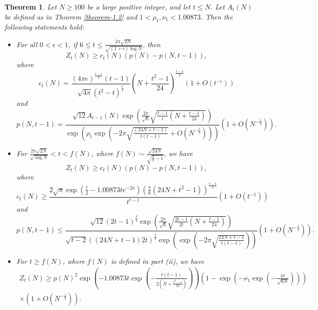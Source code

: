 \documentclass[11pt]{amsart}
\theoremstyle{plain}
\newtheorem{theorem}{Theorem}[section]
\numberwithin{equation}{section}
\begin{document}
	\begin{theorem}\label{theorem-1.4}
		Let $N\ge 100$ be a large positive integer, and let $t \le N$. Let $A_{t}(N)$ be defined as in Theorem \ref{theorem-1.2} and $1<\rho_1, \nu_1<1.00873$. Then the following statements hold:
		\begin{itemize}
			\item[\hypertarget{thm1.4i}{($i$)}]For all $0<\epsilon<1$, if $6\leq t \leq \frac{2\pi\sqrt{2N}}{\sqrt{(1+\epsilon)\log N}}$, then
			\begin{equation*}
				Z_{t}(N)\ge c_{t}(N)(p(N)-p(N,t-1)), 
			\end{equation*}
			where 
			\begin{equation*}
				c_{t}(N)=\frac{(4\pi e)^{\frac{t-1}{2}}(t-1)}{\sqrt{4\pi}(t^{2}-t)^{\frac{t}{2}}} \left(N+\frac{t^{2}-1}
				{24}\right)^{\frac{t-3}{2}}(1+O(t^{-\epsilon}))   
			\end{equation*}
			and
			\begin{equation*}
				p(N,t-1)=\frac{\sqrt{12}A_{t-1}(N)\exp\left(\frac{2\pi}{\sqrt{6}}\sqrt{\frac{t-1}{t}\left(N+\frac{t-1}{24}\right)}\right)}{\exp\left(\rho_{1}\exp\left(-2\pi\sqrt{\frac{\left(24N+t-1\right)}{t(t-1)}}+O\left(N^{-\frac{1}{2}}\right)\right)\right)}\left(1+O\left(N^{-\frac{1}{2}}\right)\right).   
			\end{equation*} 
			\item[\hypertarget{thm1.4ii}{($ii$)}] For  
			$\frac{2\pi\sqrt{2N}}{\sqrt{\log N}}< t < f(N)$, where $f(N)\sim \frac{\sqrt{24N}}{\sqrt{\frac{6}{\pi}-1}}$, we have
			\begin{equation*}
				Z_{t}(N)\ge c_{t}(N)(p(N)-p(N,t-1)), 
			\end{equation*}
			where 
			\begin{equation*}
				c_{t}(N)\ge \frac{2\sqrt{\pi}\exp\left(\frac{t}{2}-1.00873te^{-2\pi}\right)\left(\frac{\pi}{6}(24N+t^{2}-1)\right)^{\frac{t-3}{2}}}{t^{t-1}} \left(1+O\left(t^{-1}\right)\right)   
			\end{equation*}
			and
			\begin{equation*}
				p(N,t-1)\le \frac{\sqrt{12}(2t-1)^{\frac{3}{4}}\exp\left(\frac{2\pi}{\sqrt{6}}\sqrt{\frac{2t-1}{2t}\left(N+\frac{t-1}{24}\right)}\right)}{\sqrt{t-2}\left((24N+t-1)2t\right)^{\frac{3}{4}}\exp\left(\exp\left(-2\pi\sqrt{\frac{24N+t-1}{t(t-1)}}\right)\right)}\left(1+O\left(N^{-\frac{1}{2}}\right)\right).   
			\end{equation*}
			\item[\hypertarget{thm1.4iii}{($iii$)}]  For $t \ge f(N)$, where $f(N)$ is defined in part (ii), we have
			\begin{align*}
				Z_{t}(N)\ge p(N)^{2}\exp\left(-1.00873t\exp\left(-\frac{t(t-1)}{2\left(N+\frac{t^{2}-1}{24}\right)}\right)\right)\left(1-\exp\left(-\nu_{1}\exp\left(-\frac{\pi t}{\sqrt{6N}}\right)\right)\right)\\
				\times\left(1+O\left(N^{-\frac{1}{2}}\right)\right).  
			\end{align*}
		\end{itemize}
	\end{theorem}
\end{document}
